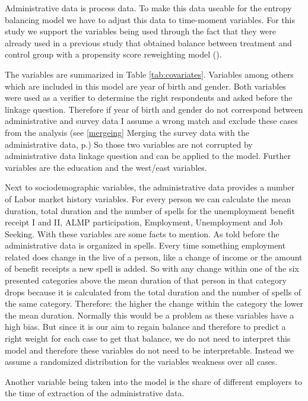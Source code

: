 Administrative data is process data. To make this data useable for the entropy balancing model we have to adjust this data to time-moment variables. For this study we support the variables being used through the fact that they were already used in a previous study that obtained balance between treatment and control group with a propensity score reweighting model (\cite{Bach15}).

The variables are summarized in Table \ref{tab:covariates}. Variables among others which are included in this model are year of birth and gender. Both variables were used as a verifier to determine the right respondents and asked before the linkage question. Therefore if year of birth and gender do not correspond between administrative and survey data I assume a wrong match and exclude these cases from the analysis (see \ref{mergeing} Merging the survey data with the administrative data, p.\pageref{merging}) So those two variables are not corrupted by administrative data linkage question and can be applied to the model. Further variables are the education and the west/east variables.



Next to sociodemographic variables, the administrative data provides a number of Labor market history variables. For every person we can calculate the mean duration, total duration and the number of spells for the unemployment benefit receipt I and II, ALMP participation, Employment, Unemployment and Job Seeking. With these variables are some facts to mention. As told before the administrative data is organized in spells. Every time something employment related does change in the live of a person, like a change of income or the amount of benefit receipts a new spell is added. So with any change within one of the six presented categories above the mean duration of that person in that category drops because it is calculated from the total duration and the number of spells of the same category. Therefore: the higher the change within the category the lower the mean duration. Normally this would be a problem as these variables have a high bias. But since it is our aim to regain balance and therefore to predict a right weight for each case to get that balance, we do not need to interpret this model and therefore these variables do not need to be interpretable. Instead we assume a randomized distribution for the variables weakness over all cases.

Another variable being taken into the model is the share of different employers to the time of extraction of the administrative data.

